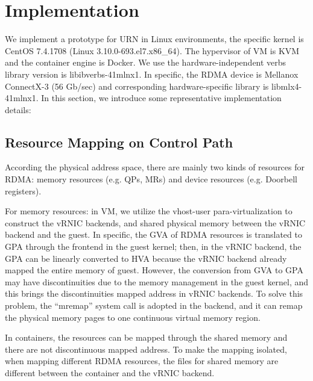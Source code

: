 \section{Implementation}
 We implement a prototype for URN in Linux environments, the specific kernel is CentOS 7.4.1708 (Linux 3.10.0-693.el7.x86\_64). The hypervisor of VM is KVM and the container engine is Docker. We use the hardware-independent verbs library version is libibverbs-41mlnx1. In specific, the RDMA device is Mellanox ConnectX-3 (56 Gb/sec) and corresponding hardware-specific library is libmlx4-41mlnx1. In this section, we introduce some representative implementation details:
 
 \subsection{Resource Mapping on Control Path}
According the physical address space, there are mainly two kinds of resources for RDMA: memory resources (e.g. QPs, MRs) and device resources (e.g. Doorbell registers). 
 
 For memory resources: 
 in VM, we utilize the vhost-user para-virtualization to construct the vRNIC backends, and shared physical memory between the vRNIC backend and the guest. In specific, the GVA of RDMA resources is translated to GPA through the frontend in the guest kernel; then, in the vRNIC backend, the GPA can be linearly converted to HVA because the vRNIC backend already mapped the entire memory of guest. However, the conversion from GVA to GPA may have  discontinuities due to the memory management in the guest kernel, and this brings the discontinuities mapped address in vRNIC backends. To solve this problem, the ``mremap'' system call is adopted in the backend, and it can remap the physical memory pages to one continuous virtual memory region.
 
 
 In containers, the resources can be mapped through the shared memory and  there are not discontinuous mapped address. To make the mapping isolated, when mapping different RDMA resources, the files for shared memory are different between the container and the vRNIC backend. 
 
